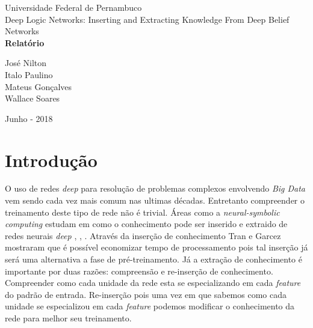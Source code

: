 \documentclass[a4paper, 12pt]{article}
\begin{document}
    \sloppy
    \begin{titlepage}
      \begin{center}
          \Huge{Universidade Federal de Pernambuco}\\
          \large{Deep Logic Networks: Inserting and Extracting
    Knowledge From Deep Belief Networks}\\ 
          \vspace{15pt}
          \vspace{95pt}
          \textbf{\LARGE{Relatório}}\\
          \vspace{3,5cm}
      \end{center}
    
      \begin{flushleft}
          \begin{tabbing}
                      José Nilton\\
                      Italo Paulino\\
                      Mateus Gonçalves\\ 
                      Wallace Soares\\
          \end{tabbing}
      \end{flushleft}
      \vspace{1cm}
    
      \begin{center}
          \vspace{\fill}
          Junho - 2018\\
      \end{center}
    \end{titlepage}
    \newpage
    \tableofcontents
    \thispagestyle{empty}
    \newpage
    \section{Introdução}
    O uso de redes \textit{deep} para resolução de problemas complexos envolvendo \textit{Big Data} vem sendo cada vez mais comum nas ultimas décadas. Entretanto compreender o treinamento deste tipo de rede não é trivial. Áreas como a \textit{neural-symbolic computing} estudam em como o conhecimento pode ser inserido e extraido de redes neurais \textit{deep} \cite{Tran}, \cite{garbook}, \cite{garConf}. Através da inserção de conhecimento Tran e Garcez \cite{Tran} mostraram que é possível economizar tempo de processamento pois tal inserção já será uma alternativa a fase de pré-treinamento.
    Já a extração de conhecimento é importante por duas razões: compreensão e re-inserção de conhecimento. Compreender como cada unidade da rede esta se especializando em cada \textit{feature} do padrão de entrada. Re-inserção pois uma vez em que sabemos como cada unidade se especializou em cada \textit{feature} podemos modificar o conhecimento da rede para melhor seu treinamento.
    
\end{document}

